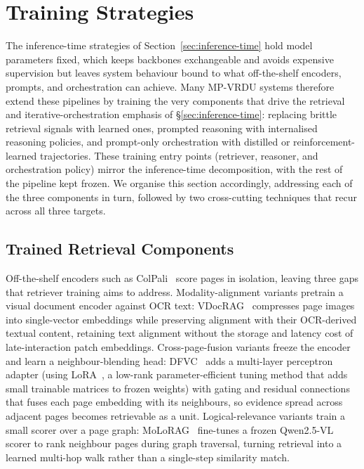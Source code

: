 \documentclass[11pt]{article}
\begin{document}
\section{Training Strategies}
\label{sec:training}

The inference-time strategies of Section~\ref{sec:inference-time} hold model parameters fixed, which keeps backbones exchangeable and avoids expensive supervision but leaves system behaviour bound to what off-the-shelf encoders, prompts, and orchestration can achieve. Many MP-VRDU systems therefore extend these pipelines by training the very components that drive the retrieval and iterative-orchestration emphasis of \S\ref{sec:inference-time}: replacing brittle retrieval signals with learned ones, prompted reasoning with internalised reasoning policies, and prompt-only orchestration with distilled or reinforcement-learned trajectories. These training entry points (retriever, reasoner, and orchestration policy) mirror the inference-time decomposition, with the rest of the pipeline kept frozen. We organise this section accordingly, addressing each of the three components in turn, followed by two cross-cutting techniques that recur across all three targets.

\subsection{Trained Retrieval Components}
\label{sec:train-retrieval}

Off-the-shelf encoders such as ColPali~\cite{faysse2024colpali} score pages in isolation, leaving three gaps that retriever training aims to address. Modality-alignment variants pretrain a visual document encoder against OCR text: VDocRAG~\cite{tanaka2025vdocrag} compresses page images into single-vector embeddings while preserving alignment with their OCR-derived textual content, retaining text alignment without the storage and latency cost of late-interaction patch embeddings. Cross-page-fusion variants freeze the encoder and learn a neighbour-blending head: DFVC~\cite{qian2026accurate} adds a multi-layer perceptron adapter (using LoRA~\cite{hu2022lora}, a low-rank parameter-efficient tuning method that adds small trainable matrices to frozen weights) with gating and residual connections that fuses each page embedding with its neighbours, so evidence spread across adjacent pages becomes retrievable as a unit. Logical-relevance variants train a small scorer over a page graph: MoLoRAG~\cite{wu2025molorag} fine-tunes a frozen Qwen2.5-VL scorer to rank neighbour pages during graph traversal, turning retrieval into a learned multi-hop walk rather than a single-step similarity match.
\end{document}
